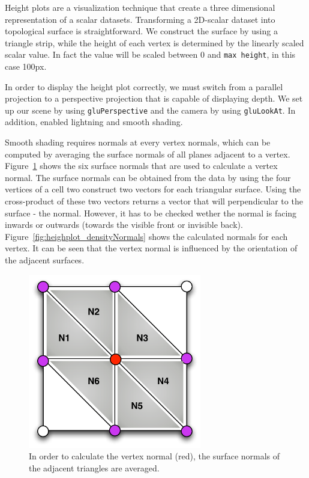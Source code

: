 Height plots are a visualization technique that create a three dimensional representation of a scalar datasets. Transforming a 2D-scalar dataset  into  topological surface is straightforward. We construct the surface by using a triangle strip, while the height of each vertex is determined by the linearly scaled scalar value. In fact the value will be scaled between 0 and \verb|max height|, in this case 100px. 

In order to display the height plot correctly, we must switch from a parallel projection to a perspective projection that is capable of displaying depth. 
We set up our scene by using \verb|gluPerspective| and the camera by using \verb|gluLookAt|. In addition, enabled lightning and smooth shading.
 
Smooth shading requires normals at every vertex normals, which can be computed by averaging the surface normals of all planes adjacent to a vertex. Figure~\ref{fig:figures_heightplot_normalization} shows the six surface normals that are used to calculate a vertex normal.
The surface normals can be obtained from the data by using the four vertices of a cell two construct two vectors for each triangular surface. Using the cross-product of these two vectors returns a vector that will perpendicular to the surface - the normal. However, it has to be checked wether the normal is facing inwards or outwards (towards the visible front or invisible back).  Figure~\ref{fig:heighplot_densityNormals} shows the calculated normals for each vertex. It can be seen that the vertex normal is influenced by the orientation of the adjacent surfaces. 

\begin{figure}[htbp]
\centering
\includegraphics[height=3in]{figures/heightplot/normalization.pdf}
\caption{In order to calculate the vertex normal (red), the surface normals of the adjacent triangles are averaged.}
\label{fig:figures_heightplot_normalization}
\end{figure} 


